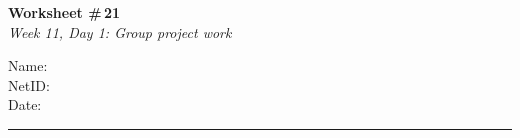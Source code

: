 \documentclass[11pt]{article}
\begin{document}
\noindent
\begin{minipage}[t]{0.55\textwidth}
  \vspace{0pt}
  {\LARGE \textbf{Worksheet \#\,21}} \\[0.3em]
  {\large \textit{Week 11, Day 1: Group project work}}
\end{minipage}
\hfill
\begin{minipage}[t]{0.40\textwidth}
  \vspace{0pt}
  \begin{mdframed}[linecolor=black, linewidth=1pt, innertopmargin=10pt, innerbottommargin=10pt]
    \small
    \vspace{0.4cm}
    Name: \underline{\hspace{4.5cm}} \\[1em]
    NetID: \underline{\hspace{4.3cm}} \\[1em]
    Date: \underline{\hspace{4.4cm}} \\
  \end{mdframed}
\end{minipage}

\vspace{1em}
\noindent\rule{\linewidth}{1pt}
\vspace{0.2em}
\end{document}

